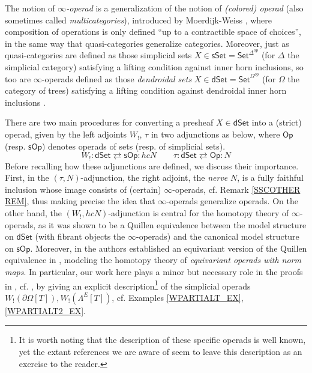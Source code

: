 \documentclass[a4paper,10pt]{article}%
\numberwithin{equation}{section}
\numberwithin{figure}{section}
\theoremstyle{definition} %
\newcommand{\Op}{\mathsf{Op}}
\newcommand{\sOp}{\mathsf{sOp}}
\newcommand{\dSet}{\mathsf{dSet}}
\begin{document}
The notion of \emph{$\infty$-operad} is a generalization of the notion of \emph{(colored) operad}
(also sometimes called \emph{multicategories}),
introduced by Moerdijk-Weiss \cite{MW07},
where composition of operations is only defined 
``up to a contractible space of choices'',
in the same way that quasi-categories generalize categories.
Moreover, just as quasi-categories are defined as those simplicial sets 
$X \in \mathsf{sSet} = \mathsf{Set}^{\Delta^{op}}$
(for $\Delta$ the simplicial category)
satisfying a lifting condition against inner horn inclusions,
so too are $\infty$-operads defined as those \emph{dendroidal sets}
$X \in \mathsf{dSet} = \mathsf{Set}^{\Omega^{op}}$
(for $\Omega$ the category of trees)
satisfying a lifting condition against 
dendroidal inner horn inclusions \cite[\S 2.1]{CM11}.

There are two main procedures for converting a presheaf
$X \in \mathsf{dSet}$
into a (strict) operad,
given by the left adjoints
$W_!$, $\tau$
in two adjunctions as below,
where $\Op$ (resp. $\sOp$) 
denotes operads of sets (resp. of simplicial sets).
\begin{equation}\label{SOPDSET_EQ}
	W_! \colon \dSet \rightleftarrows \sOp \colon h c N
	\qquad
	\tau \colon \dSet \rightleftarrows \Op \colon N
\end{equation}
Before recalling how these adjunctions are defined,
we discuss their importance. 
First, in the $(\tau,N)$-adjunction,
the right adjoint, the \emph{nerve} $N$,
is a fully faithful inclusion whose image consists of 
(certain) $\infty$-operads, 
cf. Remark \ref{SSCOTHER REM},
thus making precise the idea that 
$\infty$-operads generalize operads.
On the other hand, the $(W_!,hcN)$-adjunction
is central for the homotopy theory of $\infty$-operads,
as it was shown to be a Quillen equivalence \cite{CM13b}
between the model structure on $\dSet$ 
(with fibrant objects the $\infty$-operads)
and the canonical model structure on $\sOp$.
Moreover, in \cite{BP_TAS} the authors established an equivariant
version of the Quillen equivalence in \cite{CM13b},
modeling the homotopy theory of 
\emph{equivariant operads with norm maps}.
In particular, 
our work here plays a minor but necessary role in the proofs
in \cite{BP_TAS},
cf. \cite[Lemma 4.52]{BP_TAS},
by giving an explicit description\footnote{It is worth noting that the description of these specific operads is well known,
yet the extant references we are aware of seem to leave
this description as an exercise to the reader.}
of the simplicial operads
$W_!(\partial \Omega[T]),W_!(\Lambda^E[T])$,
cf. Examples \ref{WPARTIALT_EX},\ref{WPARTIALT2_EX}.
\end{document}

